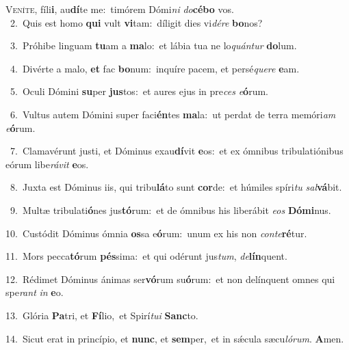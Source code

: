 \lettrine{\initial\textcolor{\initialcolor}{V}}{eníte,} fíli\-\textbf{i}\-, au\-\textbf{dí}\-te me:~\star timórem Dómi\textit{ni} \textit{do}\-\textbf{cé}\textbf{bo} vos.\\
{\numbfont\textcolor{\numbcolor}{~2.}}~Quis est homo \textbf{qui} vult \textbf{vi}\-tam:~\star díligit dies vi\-\textit{dé}\-\textit{re} \textbf{bo}\-nos?\par
{\numbfont\textcolor{\numbcolor}{~3.}}~Próhibe linguam \textbf{tu}\-am a \textbf{ma}\-lo:~\star et lábia tua ne lo\-\textit{quán}\-\textit{tur} \textbf{do}\-lum.\par
{\numbfont\textcolor{\numbcolor}{~4.}}~Divérte a malo, \textbf{et} fac \textbf{bo}\-num:~\star inquíre pacem, et persé\-\textit{que}\-\textit{re} \textbf{e}\-am.\par
{\numbfont\textcolor{\numbcolor}{~5.}}~Oculi Dómini \textbf{su}\-per \textbf{jus}\-tos:~\star et aures ejus in pre\textit{ces} \textit{e}\-\textbf{ó}rum.\par
{\numbfont\textcolor{\numbcolor}{~6.}}~Vultus autem Dómini super faci\-\textbf{én}\-tes \textbf{ma}\-la:~\star ut perdat de terra memóri\textit{am} \textit{e}\-\textbf{ó}rum.\par
{\numbfont\textcolor{\numbcolor}{~7.}}~Clamavérunt justi, et Dóminus exau\-\textbf{dí}\-vit \textbf{e}\-os:~\star et ex ómnibus tribulatiónibus eórum libe\-\textit{rá}\-\textit{vit} \textbf{e}\-os.\par
{\numbfont\textcolor{\numbcolor}{~8.}}~Juxta est Dóminus iis, qui tribu\-\textbf{lá}\-to sunt \textbf{cor}\-de:~\star et húmiles spíri\textit{tu} \textit{sal}\-\textbf{vá}bit.\par
{\numbfont\textcolor{\numbcolor}{~9.}}~Multæ tribulati\-\textbf{ó}\-nes jus\-\textbf{tó}\-rum:~\star et de ómnibus his liberábit \textit{e}\-\textit{os} \textbf{Dó}\-\textbf{mi}nus.\par
{\numbfont\textcolor{\numbcolor}{10.}}~Custódit Dóminus ómnia \textbf{os}\-sa e\-\textbf{ó}\-rum:~\star unum ex his non \textit{con}\-\textit{te}\textbf{ré}tur.\par
{\numbfont\textcolor{\numbcolor}{11.}}~Mors pecca\-\textbf{tó}\-rum \textbf{pés}\-sima:~\star et qui odérunt jus\-\textit{tum}\-, \textit{de}\-\textbf{lín}quent.\par
{\numbfont\textcolor{\numbcolor}{12.}}~Rédimet Dóminus ánimas ser\-\textbf{vó}\-rum su\-\textbf{ó}\-rum:~\star et non delínquent omnes qui spe\textit{rant} \textit{in} \textbf{e}\-o.\par
{\numbfont\textcolor{\numbcolor}{13.}}~Glória \textbf{Pa}\-tri, et \textbf{Fí}\-lio,~\star et Spirí\-\textit{tu}\-\textit{i} \textbf{Sanc}\-to.\par
{\numbfont\textcolor{\numbcolor}{14.}}~Sicut erat in princípio, et \textbf{nunc}\-, et \textbf{sem}\-per,~\star et in sǽcula sæcu\-\textit{ló}\-\textit{rum}. \textbf{A}\-men.\par
